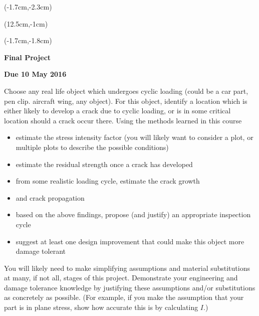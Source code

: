 \documentclass[12pt, oneside]{article}
\begin{document}


\begin{textblock*}{4cm}(-1.7cm,-2.3cm)
\end{textblock*}

\begin{textblock*}{8cm}(12.5cm,-1cm)
\end{textblock*}
\begin{textblock*}{13.5cm}(-1.7cm,-1.8cm)
\end{textblock*}

\vspace{1cm}

\begin{center}
\textbf{\Large Final Project}

\textbf{Due 10 May 2016}
\end{center}

Choose any real life object which undergoes cyclic loading (could be a car part, pen clip. aircraft wing, any object).
For this object, identify a location which is either likely to develop a crack due to cyclic loading, or is in some critical location should a crack occur there.
Using the methods learned in this course
\begin{itemize}
	\item estimate the stress intensity factor (you will likely want to consider a plot, or multiple plots to describe the possible conditions)
	\item estimate the residual strength once a crack has developed
	\item from some realistic loading cycle, estimate the crack growth
	\item and crack propagation
	\item based on the above findings, propose (and justify) an appropriate inspection cycle
	\item suggest at least one design improvement that could make this object more damage tolerant
\end{itemize}

You will likely need to make simplifying assumptions and material substitutions at many, if not all, stages of this project.
Demonstrate your engineering and damage tolerance knowledge by justifying these assumptions and/or substitutions as concretely as possible.
(For example, if you make the assumption that your part is in plane stress, show how accurate this is by calculating $I$.)
\end{document}
